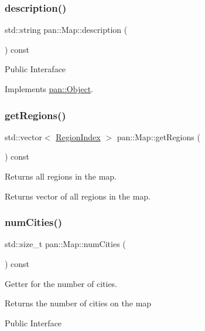 \subsubsection{\texorpdfstring{description()}{description()}}
{\footnotesize\ttfamily std\+::string pan\+::\+Map\+::description (\begin{DoxyParamCaption}{ }\end{DoxyParamCaption}) const\hspace{0.3cm}{\ttfamily [virtual]}}

Public Interaface 

Implements \hyperlink{classpan_1_1_object_a2bb6d3117bb32f5774657c83f118ed8b}{pan\+::\+Object}.

\mbox{\label{classpan_1_1_map_a580c57ef43aaf9c4c964d18340754d3c}} 
\subsubsection{\texorpdfstring{get\+Regions()}{getRegions()}}
{\footnotesize\ttfamily std\+::vector$<$ \hyperlink{namespacepan_a648dcc32a76222a9e4cd4a3e80bda642}{Region\+Index} $>$ pan\+::\+Map\+::get\+Regions (\begin{DoxyParamCaption}{ }\end{DoxyParamCaption}) const}

Returns all regions in the map. \begin{DoxyReturn}{Returns}
vector of all regions in the map. 
\end{DoxyReturn}
\mbox{\label{classpan_1_1_map_aa39642daa76646a3229fd5f92572b242}} 
\subsubsection{\texorpdfstring{num\+Cities()}{numCities()}}
{\footnotesize\ttfamily std\+::size\+\_\+t pan\+::\+Map\+::num\+Cities (\begin{DoxyParamCaption}{ }\end{DoxyParamCaption}) const\hspace{0.3cm}{\ttfamily [inline]}}

Getter for the number of cities. \begin{DoxyReturn}{Returns}
the number of cities on the map
\end{DoxyReturn}
Public Interface \mbox{\label{classpan_1_1_map_a70b6a65dc76e8911beb524062a2d09a9}} 
